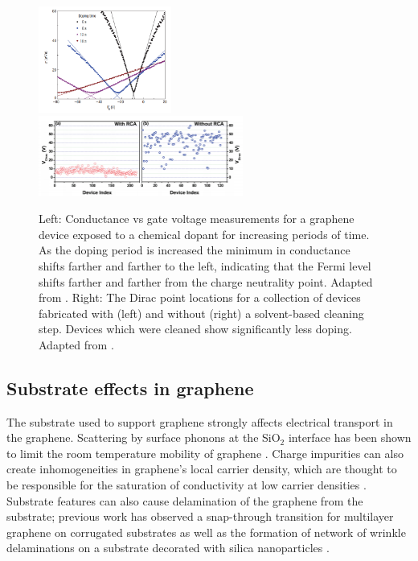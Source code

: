 \documentclass[edeposit,fullpage,draftthesis]{uiucthesis2009}
\begin{document}
            \begin{figure}
            \centering
            \includegraphics[width=0.39\textwidth]{images/background/gate_sweep_doping.png}
            \includegraphics[width=0.6\textwidth]{images/background/rca_clean.png}
            \caption[Conductance vs gate voltage after chemical doping]{
            Left: Conductance vs gate voltage measurements for a graphene device exposed to a 
            chemical dopant for increasing periods of time. As the doping period is increased
            the minimum in conductance shifts farther and farther to the left, indicating that
            the Fermi level shifts farther and farther from the charge neutrality point.
            Adapted from \cite{chen2008charged}.
            Right: The Dirac point locations for a collection of devices fabricated with (left)
            and without (right) a solvent-based cleaning step. Devices which were cleaned show 
            significantly less doping.
            Adapted from \cite{liang2011toward}.
            }
            \label{fig:chemical_doping}
            \end{figure}
    
        \subsection{Substrate effects in graphene}
        \label{sec:bg:substrates}
        
        The substrate used to support graphene strongly affects electrical transport in the graphene. 
        Scattering by surface phonons at the SiO$_2$ interface has been shown to limit the room 
        temperature mobility of graphene \cite{Chen2008}.
        Charge impurities can also create inhomogeneities in graphene's local carrier density, 
        which are thought to be responsible for the saturation of conductivity at low carrier 
        densities \cite{Hwang2007}. Substrate features can also cause delamination of the graphene 
        from the substrate; previous work has observed a snap-through transition for multilayer 
        graphene on corrugated substrates \cite{Scharfenberg2012} as well as the formation of 
        network of wrinkle delaminations on a substrate decorated with silica nanoparticles \cite{Yamamoto2012}.
    
\end{document}
